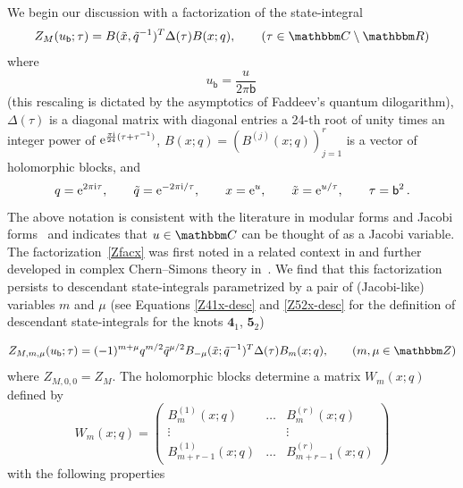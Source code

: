 \documentclass[12pt,reqno]{amsart}
\theoremstyle{definition}
\def\BZ{\mathbbm Z}
\def\BR{\mathbbm R}
\def\BC{\mathbbm C}
\def\tq{\tilde{q}}
\def\tx{\tilde{x}}
\def\bb{\mathsf{b}}
\def\ri{\mathrm{i}}
\def\tx{\tilde{x}}
\def\re{{\rm e}}
\def\ri{{\rm i}}
\def\ub{u_{\mathsf{b}}}
\def\md{\mathbf}
\newcommand{\knot}[1]{\md{#1}}
\begin{document}
We begin our discussion with a factorization of the state-integral
\begin{equation}
  \label{Zfacx}
  Z_M(\ub;\tau) = B(\tx,\tq^{-1})^T \Delta(\tau) B(x;q),
  \qquad (\tau \in \BC\setminus\BR)
\end{equation}
where
\begin{equation}
  \label{ub}
  \ub = \frac{u}{2\pi \bb} \,
\end{equation}
(this rescaling is dictated by the asymptotics of Faddeev's quantum
dilogarithm), $\Delta(\tau)$ is a diagonal matrix with diagonal
entries a 24-th root of unity times an integer power of
$\re^{\frac{\pi \ri}{24}(\tau+\tau^{-1})}$, 
$B(x;q)=(B^{(j)}(x;q))_{j=1}^r$ is a vector of holomorphic blocks, and
\begin{equation}
  \label{xq}
  q=\re^{2\pi \ri \tau}, \qquad \tq= \re^{-2 \pi \ri/\tau}, \qquad
  x=\re^{u}, \qquad \tx = \re^{u/\tau}, \qquad \tau=\bb^2 \,.
\end{equation}
The above notation is consistent with the literature in modular forms
and Jacobi forms~\cite{EZ} and indicates that $u \in \BC$ can be thought of
as a Jacobi variable. The
factorization~\eqref{Zfacx} was first noted in a related context in
\cite{pas} and further developed in complex Chern--Simons theory
in~\cite{Beem,dimofte-state}. We find that this factorization persists
to descendant state-integrals parametrized by a pair of (Jacobi-like)
variables $m$ and $\mu$ (see Equations \eqref{Z41x-desc} and
\eqref{Z52x-desc} for the definition of descendant state-integrals for
the knots $\knot{4}_1$, $\knot{5}_2$) 

\begin{equation}
  \label{ZM-desc}
  Z_{M,m,\mu}(\ub;\tau) 
  =
  (-1)^{m+\mu} q^{m/2}\tq^{\mu/2} B_{-\mu}(\tx;\tq^{-1})^T
  \Delta(\tau) B_m(x;q), \qquad (m, \mu \in \BZ)
\end{equation}
where $Z_{M,0,0}=Z_M$. The holomorphic blocks determine a matrix
$W_m(x;q)$ defined by
\begin{equation}
  \label{Wm}
  W_m(x;q) =
  \begin{pmatrix}
    B^{(1)}_{m}(x;q) & \ldots & B^{(r)}_{m}(x;q) \\
    \vdots & & \vdots \\
    B^{(1)}_{m+r-1}(x;q) & \ldots & B^{(r)}_{m+r-1}(x;q)
  \end{pmatrix}
\end{equation}
with the following properties
\end{document}
